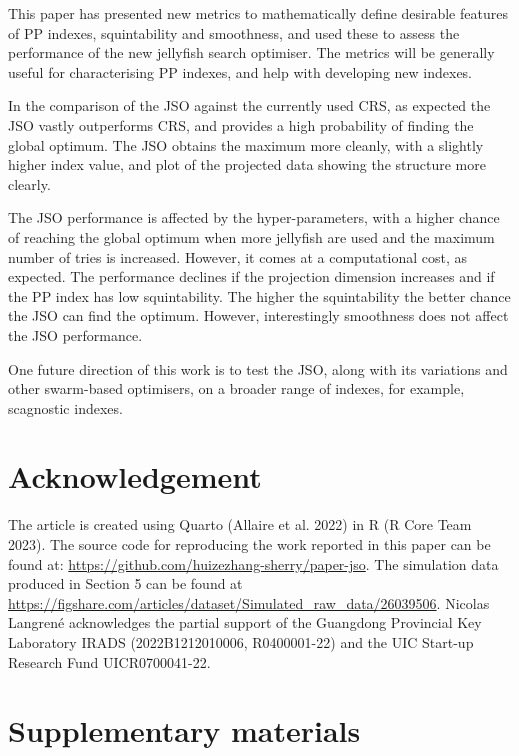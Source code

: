 \documentclass[
  12pt,
]{interact}
\theoremstyle{plain}
\begin{document}
This paper has presented new metrics to mathematically define desirable
features of PP indexes, squintability and smoothness, and used these to
assess the performance of the new jellyfish search optimiser. The
metrics will be generally useful for characterising PP indexes, and help
with developing new indexes.

In the comparison of the JSO against the currently used CRS, as expected
the JSO vastly outperforms CRS, and provides a high probability of
finding the global optimum. The JSO obtains the maximum more cleanly,
with a slightly higher index value, and plot of the projected data
showing the structure more clearly.

The JSO performance is affected by the hyper-parameters, with a higher
chance of reaching the global optimum when more jellyfish are used and
the maximum number of tries is increased. However, it comes at a
computational cost, as expected. The performance declines if the
projection dimension increases and if the PP index has low
squintability. The higher the squintability the better chance the JSO
can find the optimum. However, interestingly smoothness does not affect
the JSO performance.

One future direction of this work is to test the JSO, along with its
variations and other swarm-based optimisers, on a broader range of
indexes, for example, scagnostic indexes.

\section{Acknowledgement}\label{acknowledgement}

The article is created using Quarto (Allaire et al. 2022) in R (R Core
Team 2023). The source code for reproducing the work reported in this
paper can be found at:
\url{https://github.com/huizezhang-sherry/paper-jso}. The simulation
data produced in Section 5 can be found at
\url{https://figshare.com/articles/dataset/Simulated_raw_data/26039506}.
Nicolas Langrené acknowledges the partial support of the Guangdong
Provincial Key Laboratory IRADS (2022B1212010006, R0400001-22) and the
UIC Start-up Research Fund UICR0700041-22.

\section*{Supplementary materials}\label{supplementary-materials}
\end{document}
